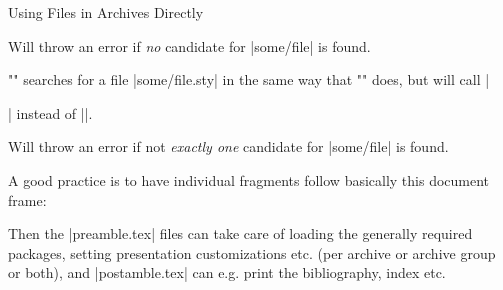 \begin{sfragment}{Using Files in \sTeX Archives Directly}
\begin{function}{\libinput}
        Will throw an error if \emph{no} candidate for |some/file|
        is found.
    \end{function}
    \begin{function}{\libusepackage}
        \stexcode"" 
        searches for a file |some/file.sty| in the same
        way that \stexcode"\libinput" does, but will
        call |\usepackage[package-options]{path/to/some/file}|
        instead of ||.

        Will throw an error if not \emph{exactly one} candidate
        for |some/file| is found.
    \end{function}

    \begin{remark}
        A good practice is to have individual \sTeX fragments
        follow basically this document frame:
        Then the |preamble.tex| files can take care
        of loading the generally required packages, setting
        presentation customizations etc. (per archive
        or archive group or both), and |postamble.tex|
        can e.g. print the bibliography, index etc.
    \end{remark}
\end{sfragment}